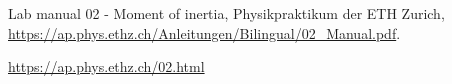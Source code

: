
\begin{thebibliography}{99}


Lab manual 02 - Moment of inertia, Physikpraktikum der ETH Zurich,  \url{https://ap.phys.ethz.ch/Anleitungen/Bilingual/02_Manual.pdf}.

\url{https://ap.phys.ethz.ch/02.html}

\end{thebibliography}